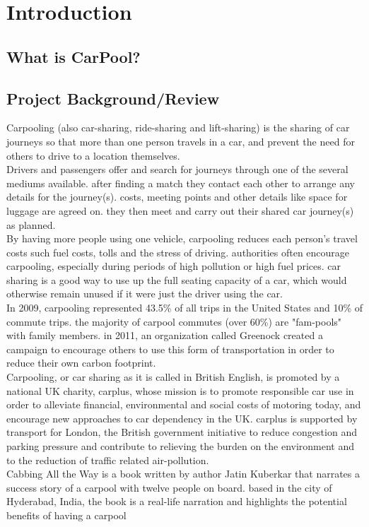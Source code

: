 \chapter{Introduction} \label{chap:intro}

\section*{What is CarPool?}

\section{Project Background/Review}
\justify
Carpooling (also car-sharing, ride-sharing and lift-sharing) is the sharing of car journeys so that more than one person travels in a car, and prevent the need for others to drive to a location themselves.\\ 

Drivers and passengers offer and search for journeys through one of the several mediums available. after finding a match they contact each other to arrange any details for the journey(s). costs, meeting points and other details like space for luggage are agreed on. they then meet and carry out their shared car journey(s) as planned.
\\ By having more people using one vehicle, carpooling reduces each person's travel costs such fuel costs, tolls and the stress of driving. authorities often encourage carpooling, especially during periods of high pollution or high fuel prices. car sharing is a good way to use up the full seating capacity of a car, which would otherwise remain unused if it were just the driver using the car.
\\ In 2009, carpooling represented 43.5\% of all trips in the United States and 10\% of commute trips. the majority of carpool commutes (over 60\%) are "fam-pools" with family members. in 2011, an organization called Greenock created a campaign to encourage others to use this form of transportation in order to reduce their own carbon footprint.
\\ Carpooling, or car sharing as it is called in British English, is promoted by a national UK charity, carplus, whose mission is to promote responsible car use in order to alleviate financial, environmental and social costs of motoring today, and encourage new approaches to car dependency in the UK. carplus is supported by transport for London, the British government initiative to reduce congestion and parking pressure and contribute to relieving the burden on the environment and to the reduction of traffic related air-pollution.
\\ Cabbing All the Way is a book written by author Jatin Kuberkar that narrates a success story of a carpool with twelve people on board. based in the city of Hyderabad, India, the book is a real-life narration and highlights the potential benefits of having a carpool

